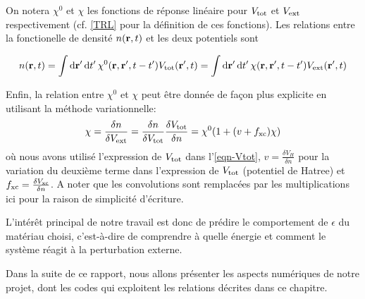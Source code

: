On notera $\chi^0$ et $\chi$ les fonctions de réponse linéaire pour
$V_{\textnormal{tot}}$ et $V_{\textnormal{ext}}$ respectivement (cf. \cref{TRL} pour la définition de ces fonctions).
Les relations entre la fonctionelle de densité $n(\vb{r}, t)$ et les deux potentiels sont

\begin{equation}
  n(\vb{r}, t) = \int \dd{\vb{r}'} \dd{t'} \chi^0(\vb{r}, \vb{r}', t-t') V_{\textnormal{tot}}(\vb{r}', t)
               = \int \dd{\vb{r}'} \dd{t'} \chi(\vb{r}, \vb{r}', t-t') V_{\textnormal{ext}}(\vb{r}', t)
\end{equation}


Enfin, la relation entre $\chi^0$ et $\chi$ peut être donnée de façon plus explicite
en utilisant la méthode variationnelle:
\begin{equation}
  \label{eqn-chi0chi}
  \chi = \frac{\delta n}{\delta V_{\textnormal{ext}}}
       = \frac{\delta n}{\delta V_{\textnormal{tot}}} \frac{\delta V_{\textnormal{tot}}}{\delta n}
       = \chi^0 ( 1 + (v+f_{\textnormal{xc}})\chi)
\end{equation}
où nous avons utilisé l'expression de $V_{\textnormal{tot}}$ dans l'\cref{eqn-Vtot},
$v = \frac{\delta V_H}{\delta n}$ pour la variation du deuxième terme dans l'expression de $V_{\textnormal{tot}}$
(potentiel de Hatree) et $f_{\textnormal{xc}} = \frac{\delta V_{\textnormal{xc}}}{\delta n}$.
A noter que les convolutions sont remplacées par les multiplications ici pour la raison de simplicité d'écriture.

L'intérêt principal de notre travail est donc de prédire le comportement de $\epsilon$ du matériau choisi,
c'est-à-dire de comprendre à quelle énergie et comment le système réagit à la perturbation externe.

Dans la suite de ce rapport, nous allons présenter les aspects numériques de notre projet,
dont les codes qui exploitent les relations décrites dans ce chapitre.
